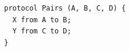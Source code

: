 \begin{lstlisting}[language={},basicstyle=\ttfamily\footnotesize,breaklines=true]
protocol Pairs (A, B, C, D) {
  X from A to B;
  Y from C to D;
}
\end{lstlisting}
